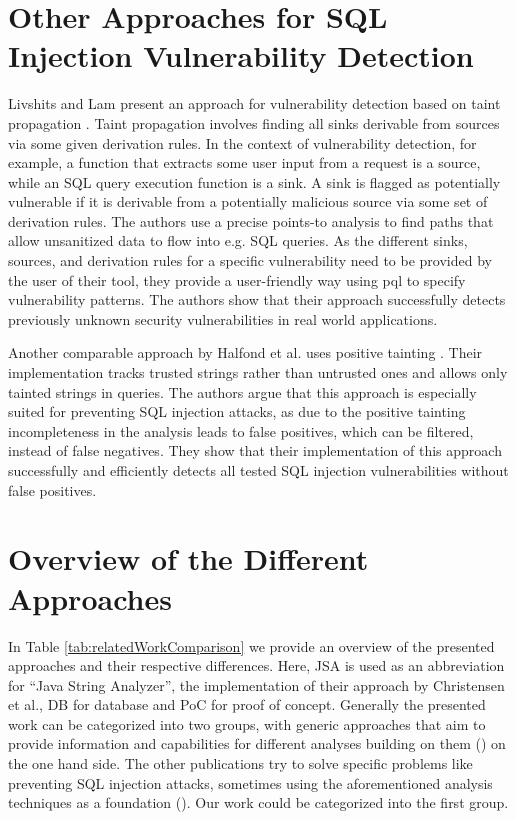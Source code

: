 \section{Other Approaches for SQL Injection Vulnerability Detection}\label{sec:related:otherSQL}

Livshits and Lam present an approach for vulnerability detection based on taint propagation \cite{livshits2005}.
Taint propagation involves finding all sinks derivable from sources via some given derivation rules. In the context of vulnerability detection, for example, a function that extracts some user input from a request is a source, while an SQL query execution function is a sink. A sink is flagged as potentially vulnerable if it is derivable from a potentially malicious source via some set of derivation rules. The authors use a precise points-to analysis to find paths that allow unsanitized data to flow into e.g. SQL queries.
As the different sinks, sources, and derivation rules for a specific vulnerability need to be provided by the user of their tool, they provide a user-friendly way using \ac{pql} to specify vulnerability patterns. 
The authors show that their approach successfully detects previously unknown security vulnerabilities in real world applications.

Another comparable approach by Halfond et al. uses positive tainting \cite{wasp}. Their implementation tracks trusted strings rather than untrusted ones and allows only tainted strings in queries. The authors argue that this approach is especially suited for preventing SQL injection attacks, as due to the positive tainting incompleteness in the analysis leads to false positives, which can be filtered, instead of false negatives. They show that their implementation of this approach successfully and efficiently detects all tested SQL injection vulnerabilities without false positives.

\section{Overview of the Different Approaches}

In Table \ref{tab:relatedWorkComparison} we provide an overview of the presented approaches and their respective differences. Here, JSA is used as an abbreviation for \enquote{Java String Analyzer}, the implementation of their approach by Christensen et al., DB for database and PoC for proof of concept. Generally the presented work can be categorized into two groups, with generic approaches that aim to provide information and capabilities for different analyses building on them (\cite{brics,banshee,regex_types}) on the one hand side. The other publications try to solve specific problems like preventing SQL injection attacks, sometimes using the aforementioned analysis techniques as a foundation (\cite{gould2004static,amnesia,wasp,xduce,xact,livshits2005,sqli_wassermann_su}). Our work could be categorized into the first group.

